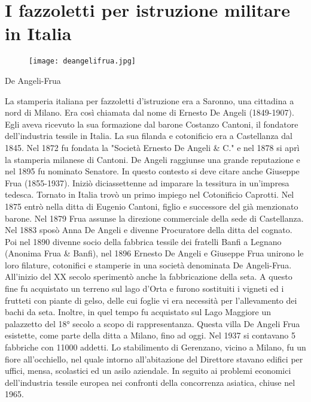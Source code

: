 \chapter[]{I fazzoletti per istruzione militare in Italia}
\graphicspath{ {./images/chapter2/} }

\begin{figure}[h]
	\centering
		\texttt{[image: deangelifrua.jpg]}
	\caption{}
	\label{fig:deangelifrua}
\end{figure}

\newpage

De Angeli-Frua

   La stamperia italiana per fazzoletti d'istruzione era a Saronno, una cittadina a nord di Milano. Era così chiamata dal nome di Ernesto De Angeli (1849-1907). Egli aveva ricevuto la sua formazione dal barone Costanzo Cantoni, il fondatore dell'industria tessile in Italia. La sua filanda e cotonificio era a Castellanza dal 1845. Nel 1872 fu fondata la "Società Ernesto De Angeli \& C." e nel 1878 si aprì la stamperia milanese di Cantoni. De Angeli raggiunse una grande reputazione e nel 1895 fu nominato Senatore.
   In questo contesto si deve citare anche Giuseppe Frua (1855-1937). Iniziò diciassettenne ad imparare la tessitura in un'impresa tedesca. Tornato in Italia trovò un primo impiego nel Cotonificio Caprotti. Nel 1875 entrò nella ditta di Eugenio Cantoni, figlio e successore del già menzionato barone. Nel 1879 Frua assunse la direzione commerciale della sede di Castellanza. Nel 1883 sposò Anna De Angeli e divenne Procuratore della ditta del cognato. Poi nel 1890 divenne socio della fabbrica tessile dei fratelli Banfi a Legnano (Anonima Frua \& Banfi), nel 1896 Ernesto De Angeli e Giuseppe Frua unirono le loro filature, cotonifici e stamperie in una società denominata De Angeli-Frua.
   All'inizio del XX secolo sperimentò anche la fabbricazione della seta. A questo fine fu acquistato un terreno sul lago d'Orta e furono sostituiti i vigneti ed i frutteti con piante di gelso, delle cui foglie vi era necessità per l'allevamento dei bachi da seta. Inoltre, in quel tempo fu acquistato sul Lago Maggiore un palazzetto del 18° secolo a scopo di rappresentanza. Questa villa De Angeli Frua esistette, come parte della ditta a Milano, fino ad oggi.
   Nel 1937 si contavano 5 fabbriche con 11000 addetti. Lo stabilimento di Gerenzano, vicino a Milano, fu un fiore all'occhiello, nel quale intorno all'abitazione del Direttore stavano edifici per uffici, mensa, scolastici ed un asilo aziendale. In seguito ai problemi economici dell'industria tessile europea nei confronti della concorrenza asiatica, chiuse nel 1965.


